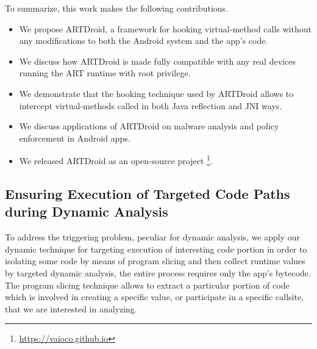 To summarize, this work makes the following contributions.

\begin{itemize}
\item We propose ARTDroid, a framework for hooking virtual-method calls without any modifications to both the Android system and the app's code.
\item We discuss how ARTDroid is made fully compatible with any real devices running the ART runtime with root privilege.
\item We demonstrate that the hooking technique used by ARTDroid allows to intercept virtual-methods called in both Java reflection and JNI ways.
\item We discuss applications of ARTDroid on malware analysis and policy enforcement in Android apps.
\item We released ARTDroid as an open-source project \footnote{\url{https://vaioco.github.io}}. 
\end{itemize}


\subsection{Ensuring Execution of Targeted Code Paths during Dynamic Analysis}


To address the triggering problem, peculiar for dynamic analysis, we apply our dynamic technique for targeting execution of interesting code portion in order to isolating some code by means of program slicing and then collect runtime values by targeted dynamic analysis, the entire process requires only the app's bytecode. The program slicing technique allows to extract a particular portion of code which is involved in creating a specific value, or participate in a specific callsite, that we are interested in analyzing. 


